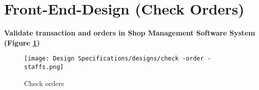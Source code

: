 \section{Front-End-Design (Check Orders)}
\vspace{1cm}
\textbf{Validate transaction and orders in Shop Management Software System (Figure \ref{fig:fig 5.14})}\\

\begin{figure}[ht]
    \centering  
    \texttt{[image: Design Specifications/designs/check -order - staffs.png]}    
    \caption{Check orders}
    \label{fig:fig 5.14}
\end{figure}